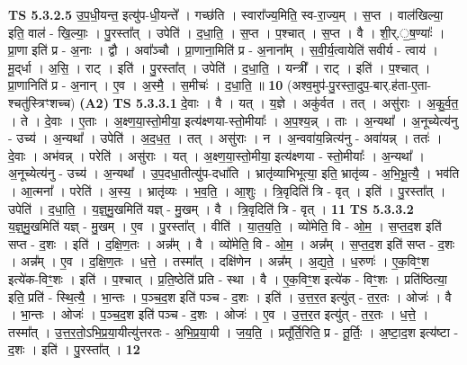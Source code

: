 \documentclass[17pt]{extarticle}
\begin{document}
                  \newline
                                \textbf{ TS 5.3.2.5} \newline
                  उ॒प॒धी॒यन्त॒ इत्यु॑प-धी॒यन्ते᳚ । गच्छ॑ति । स्वारा᳚ज्य॒मिति॒ स्व-रा॒ज्य॒म् । स॒प्त । वाल॑खिल्या॒ इति॒ वाल॑ - खि॒ल्याः॒ । पु॒रस्ता᳚त् । उपेति॑ । द॒धा॒ति॒ । स॒प्त । प॒श्चात् । स॒प्त । वै । शी॒र्.॒ष॒ण्याः᳚ । प्रा॒णा इति॑ प्र - अ॒नाः । द्वौ । अवा᳚ञ्चौ । प्रा॒णाना॒मिति॑ प्र - अ॒नाना᳚म् । स॒वी॒र्य॒त्वायेति॑ सवीर्य - त्वाय॑ । मू॒द्‌र्धा । अ॒सि॒ । राट् । इति॑ । पु॒रस्ता᳚त् । उपेति॑ । द॒धा॒ति॒ । यन्त्री᳚ । राट् । इति॑ । प॒श्चात् । प्रा॒णानिति॑ प्र - अ॒नान् । ए॒व । अ॒स्मै॒ । स॒मीचः॑ । द॒धा॒ति॒ ॥ \textbf{  10 } \newline
                  \newline
                      (अश्व॒मुप॑-पु॒रस्ता॒दुप॒-बार्.ह॑ता-ए॒ता-श्चतु॑स्त्रिꣳशच्च)  \textbf{(A2)} \newline \newline
                                \textbf{ TS 5.3.3.1} \newline
                  दे॒वाः । वै । यत् । य॒ज्ञे । अकु॑र्वत । तत् । असु॑राः । अ॒कु॒र्व॒त॒ । ते । दे॒वाः । ए॒ताः । अ॒क्ष्ण॒या॒स्तो॒मीया॒ इत्य॑क्ष्णया-स्तो॒मीयाः᳚ । अ॒प॒श्य॒न्न् । ताः । अ॒न्यथा᳚ । अ॒नूच्येत्य॑नु - उच्य॑ । अ॒न्यथा᳚ । उपेति॑ । अ॒द॒ध॒त॒ । तत् । असु॑राः । न । अ॒न्ववा॑य॒न्नित्य॑नु - अवा॑यन्न् । ततः॑ । दे॒वाः । अभ॑वन्न् । परेति॑ । असु॑राः । यत् । अ॒क्ष्ण॒या॒स्तो॒मीया॒ इत्य॑क्ष्णया - स्तो॒मीयाः᳚ । अ॒न्यथा᳚ । अ॒नूच्येत्य॑नु - उच्य॑ । अ॒न्यथा᳚ । उ॒प॒दधा॒तीत्यु॑प-दधा॑ति । भ्रातृ॑व्याभिभूत्या॒ इति॒ भ्रातृ॑व्य - अ॒भि॒भू॒त्यै॒ । भव॑ति । आ॒त्मना᳚ । परेति॑ । अ॒स्य॒ । भ्रातृ॑व्यः । भ॒व॒ति॒ । आ॒शुः । त्रि॒वृदिति॑ त्रि - वृत् । इति॑ । पु॒रस्ता᳚त् । उपेति॑ । द॒धा॒ति॒ । य॒ज्ञ्॒मु॒खमिति॑ यज्ञ् - मु॒खम् । वै । त्रि॒वृदिति॑ त्रि - वृत् । \textbf{  11} \newline
                  \newline
                                \textbf{ TS 5.3.3.2} \newline
                  य॒ज्ञ्॒मु॒खमिति॑ यज्ञ् - मु॒खम् । ए॒व । पु॒रस्ता᳚त् । वीति॑ । या॒त॒य॒ति॒ । व्यो॑मेति॒ वि - ओ॒म॒ । स॒प्त॒द॒श इति॑ सप्त - द॒शः । इति॑ । द॒क्षि॒ण॒तः । अन्न᳚म् । वै । व्यो॑मेति॒ वि - ओ॒म॒ । अन्न᳚म् । स॒प्त॒द॒श इति॑ सप्त - द॒शः । अन्न᳚म् । ए॒व । द॒क्षि॒ण॒तः । ध॒त्ते॒ । तस्मा᳚त् । दक्षि॑णेन । अन्न᳚म् । अ॒द्य॒ते॒ । ध॒रुणः॑ । ए॒क॒विꣳ॒॒श इत्ये॑क-विꣳ॒॒शः । इति॑ । प॒श्चात् । प्र॒ति॒ष्ठेति॑ प्रति - स्था । वै । ए॒क॒विꣳ॒॒श इत्ये॑क - विꣳ॒॒शः । प्रति॑ष्ठित्या॒ इति॒ प्रति॑ - स्थि॒त्यै॒ । भा॒न्तः । प॒ञ्च॒द॒श इति॑ पञ्च - द॒शः । इति॑ । उ॒त्त॒र॒त इत्यु॑त् - त॒र॒तः । ओजः॑ । वै । भा॒न्तः । ओजः॑ । प॒ञ्च॒द॒श इति॑ पञ्च - द॒शः । ओजः॑ । ए॒व । उ॒त्त॒र॒त इत्यु॑त् - त॒र॒तः । ध॒त्ते॒ । तस्मा᳚त् । उ॒त्त॒र॒तो॒ऽभि॒प्र॒या॒यीत्यु॑त्तरतः - अ॒भि॒प्र॒या॒यी । ज॒य॒ति॒ । प्रतू᳚र्ति॒रिति॒ प्र - तू॒र्तिः॒ । अ॒ष्टा॒द॒श इत्य॑ष्टा - द॒शः । इति॑ । पु॒रस्ता᳚त् । \textbf{  12} \newline
\end{document}
